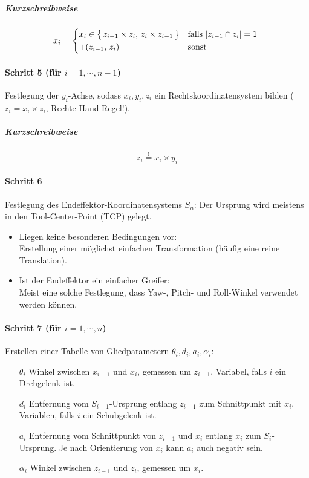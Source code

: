 					\subparagraph{Kurzschreibweise}
					\begin{equation*}
						x_i =
							\begin{cases*}
								x_i \in \big\{\, z_{i - 1} \times z_i,\, z_i \times z_{i - 1} \,\big\} & falls \( \lvert z_{i - 1} \cap z_i \rvert = 1 \) \\
								\raisebox{-1pt}{\(\bot\)}(z_{i - 1},\, z_i) & sonst
							\end{cases*}
					\end{equation*}
				
				\paragraph{Schritt 5 (für \( i = 1, \cdots, n - 1 \))}
					Festlegung der \(y_i\)-Achse, sodass \( x_i, y_i, z_i \) ein Rechtskoordinatensystem bilden (\dh \( z_i = x_i \times z_i \), Rechte-Hand-Regel!).
					
					\subparagraph{Kurzschreibweise}
					\begin{equation*}
						z_i \overset{!}{=} x_i \times y_i
					\end{equation*}
				
				\paragraph{Schritt 6}
					Festlegung des Endeffektor-Koordinatensystems \(S_n\): Der Ursprung wird meistens in den Tool-Center-Point (TCP) gelegt.
					\begin{itemize}
						\item Liegen keine besonderen Bedingungen vor: \\ Erstellung einer möglichst einfachen Transformation (häufig eine reine Translation).
						\item Ist der Endeffektor ein einfacher Greifer: \\ Meist eine solche Festlegung, dass Yaw-, Pitch- und Roll-Winkel verwendet werden können.
					\end{itemize}
				
				\paragraph{Schritt 7 (für \( i = 1, \cdots, n \))}
					Erstellen einer Tabelle von Gliedparametern \( \theta_i, d_i, a_i, \alpha_i \):
					\begin{itemize}
						\item[\(\theta_i\)] Winkel zwischen \(x_{i - 1}\) und \(x_i\), gemessen um \(z_{i - 1}\). Variabel, falls \(i\) ein Drehgelenk ist.
						\item[\(d_i\)] Entfernung vom \(S_{i - 1}\)-Ursprung entlang \(z_{i - 1}\) zum Schnittpunkt mit \(x_i\). Variablen, falls \(i\) ein Schubgelenk ist.
						\item[\(a_i\)] Entfernung vom Schnittpunkt von \(z_{i - 1}\) und \(x_i\) entlang \(x_i\) zum \(S_i\)-Ursprung. Je nach Orientierung von \(x_i\) kann \(a_i\) auch negativ sein.
						\item[\(\alpha_i\)] Winkel zwischen \( z_{i - 1} \) und \(z_i\), gemessen um \(x_i\).
					\end{itemize}
				
